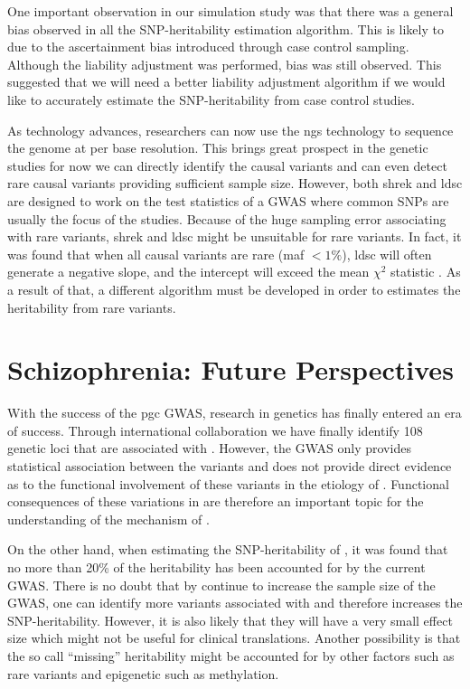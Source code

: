 \documentclass[12pt]{book}
\newcommand*{\glng}{\glsentrylong}
\begin{document}
	One important observation in our simulation study was that there was a general bias observed in all the \gls{SNP}-heritability estimation algorithm.
	This is likely to due to the ascertainment bias introduced through case control sampling.
	Although the liability adjustment was performed, bias was still observed. 
	This suggested that we will need a better liability adjustment algorithm if we would like to accurately estimate the \gls{SNP}-heritability from case control studies.
	
	As technology advances, researchers can now use the \gls{ngs} technology to sequence the genome at per base resolution. 
	This brings great prospect in the genetic studies for now we can directly identify the causal variants and can even detect rare causal variants providing sufficient sample size. 
	However, both \gls{shrek} and \gls{ldsc} are designed to work on the test statistics of a \gls{GWAS} where common \glspl{SNP} are usually the focus of the studies. 
	Because of the huge sampling error associating with rare variants, \gls{shrek} and \gls{ldsc} might be unsuitable for rare variants. 
	In fact, it was found that when all causal variants are rare (\gls{maf} $<1\%$), \gls{ldsc} will often generate a negative slope, and the intercept will exceed the mean $\chi^2$ statistic \citep{Bulik-Sullivan2015}.
	As a result of that, a different algorithm must be developed in order to estimates the heritability from rare variants.
	
	\section{Schizophrenia: Future Perspectives}
	With the success of the \gls{pgc} \glng{scz} \gls{GWAS}, research in \glng{scz} genetics has finally entered an era of success.
	Through international collaboration we have finally identify 108 genetic loci that are associated with \glng{scz} \citep{Ripke2013}.
	However, the \gls{GWAS} only provides statistical association between the variants \glng{scz} and does not provide direct evidence as to the functional involvement of these variants in the etiology of \glng{scz}.
	Functional consequences of these variations in \glng{scz} are therefore an important topic for the understanding of the mechanism of \glng{scz}.
	
	On the other hand, when estimating the \gls{SNP}-heritability of \glng{scz}, it was found that no more than 20\% of the heritability has been accounted for by the current \gls{GWAS}.
	There is no doubt that by continue to increase the sample size of the \gls{GWAS}, one can identify more variants associated with \glng{scz} and therefore increases the \gls{SNP}-heritability. 
	However, it is also likely that they will have a very small effect size which might not be useful for clinical translations.
	Another possibility is that the so call ``missing'' heritability might be accounted for by other factors such as rare variants and epigenetic such as methylation.
	
\end{document}
